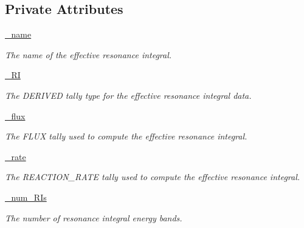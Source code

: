 \subsection*{Private Attributes}
\begin{DoxyCompactItemize}
\item 
\hypertarget{classpinspec_1_1process_1_1RIEff_ac301e973346fc58c883b4be4d1dfb16d}{\hyperlink{classpinspec_1_1process_1_1RIEff_ac301e973346fc58c883b4be4d1dfb16d}{\-\_\-name}}\label{classpinspec_1_1process_1_1RIEff_ac301e973346fc58c883b4be4d1dfb16d}

\begin{DoxyCompactList}\small\item\em The name of the effective resonance integral. \end{DoxyCompactList}\item 
\hypertarget{classpinspec_1_1process_1_1RIEff_a05447de3e70c5b7527aed85dbea6391d}{\hyperlink{classpinspec_1_1process_1_1RIEff_a05447de3e70c5b7527aed85dbea6391d}{\-\_\-\-R\-I}}\label{classpinspec_1_1process_1_1RIEff_a05447de3e70c5b7527aed85dbea6391d}

\begin{DoxyCompactList}\small\item\em The D\-E\-R\-I\-V\-E\-D tally type for the effective resonance integral data. \end{DoxyCompactList}\item 
\hypertarget{classpinspec_1_1process_1_1RIEff_af0215d52bf5723c78262906e8c7f08c2}{\hyperlink{classpinspec_1_1process_1_1RIEff_af0215d52bf5723c78262906e8c7f08c2}{\-\_\-flux}}\label{classpinspec_1_1process_1_1RIEff_af0215d52bf5723c78262906e8c7f08c2}

\begin{DoxyCompactList}\small\item\em The F\-L\-U\-X tally used to compute the effective resonance integral. \end{DoxyCompactList}\item 
\hypertarget{classpinspec_1_1process_1_1RIEff_a3f4dc5383e688ba931f0e59217537500}{\hyperlink{classpinspec_1_1process_1_1RIEff_a3f4dc5383e688ba931f0e59217537500}{\-\_\-rate}}\label{classpinspec_1_1process_1_1RIEff_a3f4dc5383e688ba931f0e59217537500}

\begin{DoxyCompactList}\small\item\em The R\-E\-A\-C\-T\-I\-O\-N\-\_\-\-R\-A\-T\-E tally used to compute the effective resonance integral. \end{DoxyCompactList}\item 
\hypertarget{classpinspec_1_1process_1_1RIEff_a3cb90b203ab23c3a8e1d846ab0f722b8}{\hyperlink{classpinspec_1_1process_1_1RIEff_a3cb90b203ab23c3a8e1d846ab0f722b8}{\-\_\-num\-\_\-\-R\-Is}}\label{classpinspec_1_1process_1_1RIEff_a3cb90b203ab23c3a8e1d846ab0f722b8}

\begin{DoxyCompactList}\small\item\em The number of resonance integral energy bands. \end{DoxyCompactList}\end{DoxyCompactItemize}


